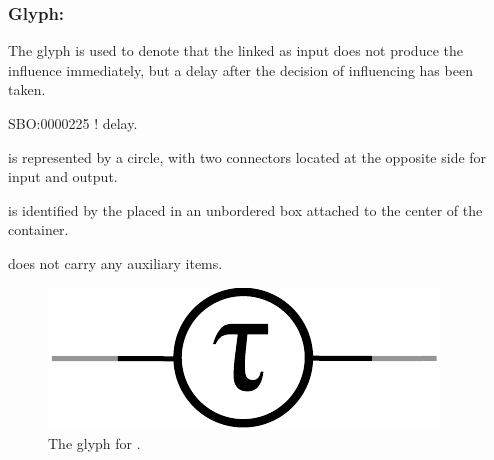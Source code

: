 \subsubsection{Glyph: }\label{sec:delay}

The glyph  is used to denote that the  linked as input does not produce the influence immediately, but a delay after the decision of influencing has been taken.

\begin{glyphDescription}

 \glyphSboTerm SBO:0000225 ! delay.

 \glyphContainer {} is represented by a circle, with two connectors located at the opposite side for input and output.

 \glyphLabel {} is identified by the  placed in an unbordered box attached to the center of the container. 

  \glyphAux {} does not carry any auxiliary items.

\end{glyphDescription}

\begin{figure}[H]
  \centering
  \includegraphics[scale = 0.5]{images/delay}
  \caption{The \ER glyph for .}
  \label{fig:delay}
\end{figure}

